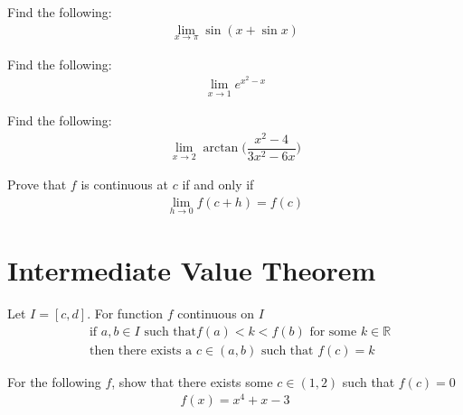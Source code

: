 \begin{exercise}
Find the following:
\begin{align*}
    \lim_{x \longrightarrow \pi} \sin (x + \sin x)
\end{align*}
\end{exercise}

\begin{exercise}
Find the following:
\begin{align*}
    \lim_{x \longrightarrow 1} e^{x^{2}-x}
\end{align*}
\end{exercise}

\begin{exercise}
Find the following:
\begin{align*}
    \lim_{x \longrightarrow 2} \arctan \Big( \dfrac{x^{2}-4}{3x^{2}-6x} \Big)
\end{align*}
\end{exercise}

\begin{exercise}
Prove that $f$ is continuous at $c$ if and only if
\begin{align*}
    \lim_{h \longrightarrow 0} f(c + h) = f(c)
\end{align*}
\end{exercise}

\newpage
\section{Intermediate Value Theorem}

\begin{theorem}
Let $I = [c, d]$. For function $f$ continuous on $I$
\begin{align*}
    &\text{if} \hspace{4pt} a, b \in I \hspace{4pt} \text{such that} f(a)<k<f(b) \hspace{4pt} \text{for some} \hspace{4pt} k \in \mathbb{R}\\[2ex]
    &\text{then there exists a} \hspace{4pt} c \in (a, b) \hspace{4pt} \text{such that} \hspace{4pt} f(c) = k 
\end{align*}
\end{theorem}

\begin{exercise}
For the following $f$, show that there exists some $c \in (1, 2)$ such that $f(c)=0$
\begin{align*}
    f(x) = x^{4} + x - 3
\end{align*}
\end{exercise}

